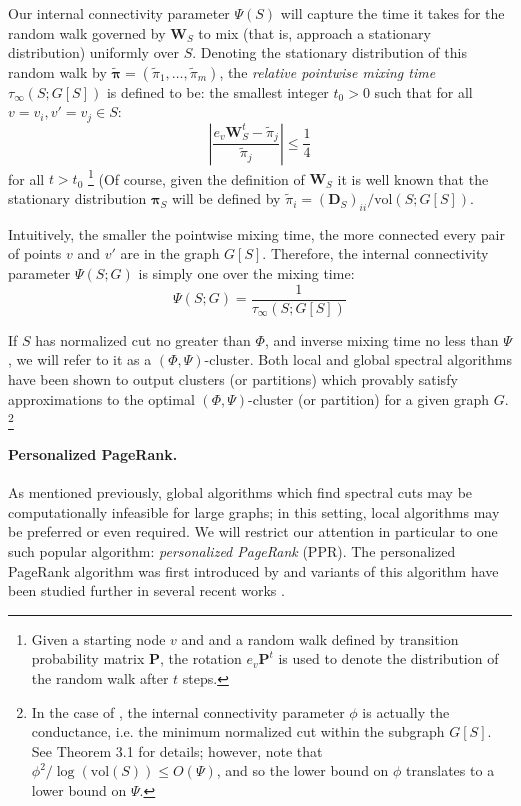 \documentclass{article}
\newcommand{\vol}{\mathrm{vol}}
\newcommand{\abs}[1]{\left \lvert #1 \right \rvert}
\newcommand{\1}{\mathbf{1}}
\newcommand{\pibf}{\bm{\pi}}
\newcommand{\Wbf}{\mathbf{W}}
\newcommand{\Dbf}{\mathbf{D}}
\newcommand{\ppr}{{\sc PPR}}
\theoremstyle{aldenthm}
\theoremstyle{remark}
\begin{document}
Our internal connectivity parameter $\Psi(S)$ will capture the time it takes for the random walk governed by $\Wbf_S$ to mix (that is, approach a stationary distribution) uniformly over $S$. Denoting the stationary distribution of this random walk by $\widetilde{\pibf} = (\widetilde{\pi}_{1}, \ldots, \widetilde{\pi}_{m})$, the \emph{relative pointwise mixing time} $\tau_{\infty}(S; G[S])$ is defined to be: the smallest integer $t_0 > 0$ such that for all $v = v_i,v' = v_j \in S$:
\begin{equation*}
\abs{\frac{e_v \Wbf_S^t - \widetilde{\pi}_{j}}{\widetilde{\pi}_{j}}} \leq \frac{1}{4}
\end{equation*}
for all $t > t_0$
\footnote{Given a starting node $v$ and and a random walk defined by transition probability matrix $\mathbf{P}$, the rotation $e_v \mathbf{P}^t$ is used to denote the distribution of the random walk after $t$ steps.} (Of course, given the definition of $\Wbf_S$ it is well known that the stationary distribution $\pibf_S$ will be defined by $\widetilde{\pi}_{i} = (\Dbf_{S})_{ii} / \vol(S; G[S])$. 

Intuitively, the smaller the pointwise mixing time, the more connected every pair of points $v$ and $v'$ are in the graph $G[S]$. Therefore, the internal connectivity parameter $\Psi(S; G)$ is simply one over the mixing time:
\begin{equation}
\label{eqn: inv_mixing_time}
\Psi(S; G) = \frac{1}{\tau_{\infty}(S; G[S])}
\end{equation}

If $S$ has normalized cut no greater than $\Phi$, and inverse mixing time no less than $\Psi$, we will refer to it as a $(\Phi,\Psi)$-cluster. Both local \cite{zhu2013} and global \cite{kannan04} spectral algorithms have been shown to output clusters (or partitions) which provably satisfy approximations to the optimal $(\Phi, \Psi)$-cluster (or partition) for a given graph $G$. \footnote{In the case of \cite{kannan04}, the internal connectivity parameter $\phi$ is actually the conductance, i.e. the minimum normalized cut within the subgraph $G[S]$. See Theorem 3.1 for details; however, note that $\phi^2 / \log(\vol(S)) \leq O(\Psi)$, and so the lower bound on $\phi$ translates to a lower bound on $\Psi$.}

\paragraph{Personalized PageRank.}
As mentioned previously, global algorithms which find spectral cuts may be computationally infeasible for large graphs; in this setting, local algorithms may be preferred or even required. We will restrict our attention in particular to one such popular algorithm: \emph{personalized PageRank} (\ppr). The personalized PageRank algorithm was first introduced by \cite{haveliwala2003} and variants of this algorithm have been studied further in several recent works \citep{spielman2011,spielman2014,zhu2013,anderson2006,mahoney2012}. 
\end{document}
